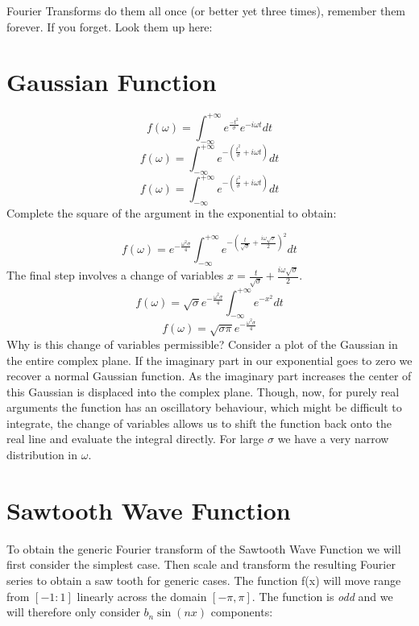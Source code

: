\documentclass{article}
\begin{document}
Fourier Transforms do them all once (or better yet three times), remember them forever. If you forget. Look them up here:
\section{Gaussian Function}
%
\begin{equation}
f(\omega) = \int_{-\infty}^{+\infty} e^{\frac{-t^{2}}{\sigma}} e^{-i\omega t} dt
\end{equation}
%
\begin{equation}
f(\omega) = \int_{-\infty}^{+\infty} e^{-(\frac{t^{2}}{\sigma} + i\omega t)} dt
\end{equation}
%
\begin{equation}
f(\omega) = \int_{-\infty}^{+\infty} e^{-(\frac{t^{2}}{\sigma} + i\omega t)} dt
\end{equation}
%
Complete the square of the argument in the exponential to obtain:

%
\begin{equation}
f(\omega) = e^{-\frac{\omega^{2} \sigma}{4}} \int_{-\infty}^{+\infty} e^{-(\frac{t}{\sqrt{\sigma}} + \frac{i\omega \sqrt{\sigma}}{2})^{2}} dt
\end{equation}
%
The final step involves a change of variables $x = \frac{t}{\sqrt{\sigma}} + \frac{i\omega\sqrt{\sigma}}{2}$.
%
\begin{equation}
f(\omega) = \sqrt{\sigma}e^{-\frac{\omega^{2} \sigma}{4}} \int_{-\infty}^{+\infty} e^{-x^{2}} dt
\end{equation}
%
\begin{equation}
f(\omega) = \sqrt{\sigma \pi} e^{-\frac{\omega^{2} \sigma}{4}} 
\end{equation}
%
Why is this change of variables permissible? Consider a plot of the Gaussian in the entire complex plane. If the imaginary part in our exponential
goes to zero we recover a normal Gaussian function. As the imaginary part increases the center of this Gaussian is displaced into the complex plane.
Though, now, for purely real arguments the function has an oscillatory behaviour, which might be difficult to integrate,
the change of variables allows us to shift the function back onto the real line and evaluate the integral directly.
%
For large $\sigma$ we have a very narrow distribution in $\omega$.

\section{Sawtooth Wave Function}
%
To obtain the generic Fourier transform of the Sawtooth Wave Function we will 
first consider the simplest case. Then scale and transform the resulting
Fourier series to obtain a saw tooth for generic cases.
The function f(x) will move range from $[-1:1]$ linearly across
the domain $[-\pi, \pi]$. The function is \emph{odd} and we
will therefore only consider $b_{n}\sin{(nx)}$ components: 
\end{document}
